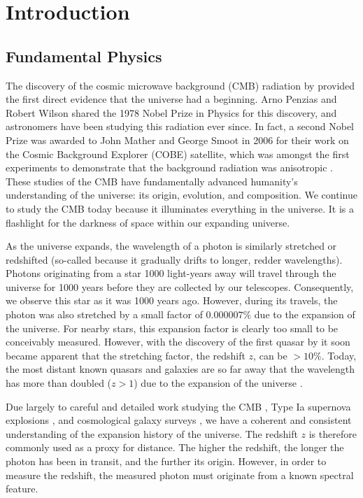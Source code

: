 \chapter{Introduction}

\begin{bibunit}

\section{Fundamental Physics}

The discovery of the cosmic microwave background (CMB) radiation by \citet{1965ApJ...142..419P}
provided the first direct evidence that the universe had a beginning. Arno Penzias and Robert Wilson
shared the 1978 Nobel Prize in Physics for this discovery, and astronomers have been studying this
radiation ever since. In fact, a second Nobel Prize was awarded to John Mather and George Smoot in
2006 for their work on the Cosmic Background Explorer (COBE) satellite, which was amongst the first
experiments to demonstrate that the background radiation was anisotropic
\citep{1992ApJ...396L...1S}. These studies of the CMB have fundamentally advanced humanity's
understanding of the universe: its origin, evolution, and composition. We continue to study the CMB
today because it illuminates everything in the universe. It is a flashlight for the darkness of
space within our expanding universe.

As the universe expands, the wavelength of a photon is similarly stretched or redshifted (so-called
because it gradually drifts to longer, redder wavelengths). Photons originating from a star 1000
light-years away will travel through the universe for 1000 years before they are collected by our
telescopes. Consequently, we observe this star as it was 1000 years ago. However, during its
travels, the photon was also stretched by a small factor of $0.000007\%$ due to the expansion of the
universe.  For nearby stars, this expansion factor is clearly too small to be conceivably measured.
However, with the discovery of the first quasar by \citet{1963Natur.197.1040S} it soon became
apparent that the stretching factor, the redshift $z$, can be $>10\%$. Today, the most distant known
quasars and galaxies are so far away that the wavelength has more than doubled ($z > 1$) due to the
expansion of the universe \citep[e.g.,][]{2011Natur.474..616M, 2015ApJ...810L..12Z,
2016ApJ...819..129O, 2018Natur.553..473B}.

Due largely to careful and detailed work studying the CMB \citep[e.g.,][]{2013ApJS..208...19H,
2016A&A...594A..25P}, Type Ia supernova explosions \citep[e.g.,][]{1998AJ....116.1009R,
1999ApJ...517..565P}, and cosmological galaxy surveys \citep[e.g.,][]{2001MNRAS.328.1039C}, we have
a coherent and consistent understanding of the expansion history of the universe. The redshift $z$
is therefore commonly used as a proxy for distance. The higher the redshift, the longer the photon
has been in transit, and the further its origin. However, in order to measure the redshift, the
measured photon must originate from a known spectral feature.


\end{bibunit}
